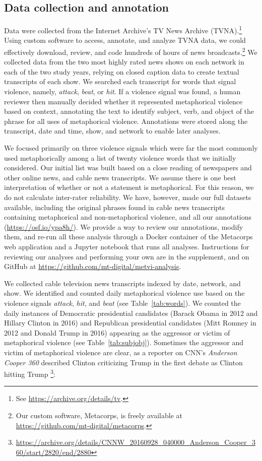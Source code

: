 \subsection{Data collection and annotation}

Data were collected from the Internet Archive's TV News Archive
(TVNA).\footnote{See \url{https://archive.org/details/tv}.} Using custom
software to access, annotate, and analyze TVNA data, we could effectively
download, review, and code hundreds of hours of news broadcasts.\footnote{Our
custom software, Metacorps, is freely available at
\url{https://github.com/mt-digital/metacorps}.} We collected data from the two
most highly rated news shows on each network in each of the two study years,
relying on closed caption data  to create textual transcripts of each show. We
searched each transcript for words that signal violence, namely, \emph{attack},
\emph{beat}, or \emph{hit}. If a violence signal was found, a human reviewer
then manually decided whether it represented metaphorical violence based on
context, annotating the text to identify subject, verb, and object of the phrase
for all uses of metaphorical violence. Annotations were stored along the
transcript, date and time, show, and network to enable later analyses.

We focused primarily on three violence signals which were far the most commonly
used metaphorically among a list of twenty violence words that we initially 
considered. Our initial list was built based on a close reading of newspapers 
and other online news, and cable news transcripts. We assume there is one 
best interpretation of whether or not a statement is metaphorical. For this reason,
we do not calculate inter-rater reliability. We have, however, made our 
full datasets available, including the original phrases found in cable news 
transcripts containing metaphorical and non-metaphorical violence, and all
our annotations (\url{https://osf.io/ypa8h/}). We provide a way to review our 
annotations, modify them, and re-run all these analysis through a Docker 
container of the Metacorps web application and a Jupyter notebook that 
runs all analyses. Instructions for reviewing our analyses and performing your
own are in the supplement, and on GitHub at 
\url{https://github.com/mt-digital/metvi-analysis}.

We collected cable television news transcripts indexed by date, network, and
show. We identified and counted daily metaphorical
violence use based on the violence signals \emph{attack}, \emph{hit}, and
\emph{beat} (see Table~\ref{tab:words}). We counted the daily instances of
Democratic presidential candidates (Barack Obama in 2012 and Hillary Clinton in
2016) and Republican presidential candidates (Mitt Romney in 2012 and Donald
Trump in 2016) appearing as the aggressor or victim of metaphorical violence
(see Table~\ref{tab:subjobj}). Sometimes the aggressor and victim of metaphorical 
violence are clear, as a reporter on CNN's \emph{Anderson Cooper 360}
described Clinton criticizing Trump in the first debate as Clinton hitting Trump
\footnote{\url{https://archive.org/details/CNNW_20160928_040000_Anderson_Cooper_360/start/2820/end/2880}}:

